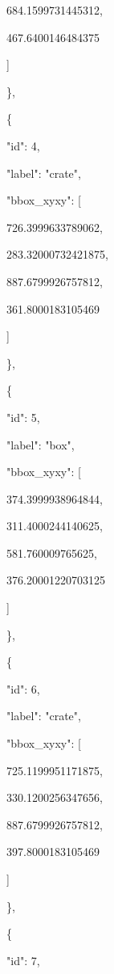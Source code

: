 \documentclass[10pt,a4paper]{article}
\begin{document}
        684.1599731445312,\allowbreak{}\par
        467.6400146484375\par
      ]\par
    \},\allowbreak{}\par
    \{\par
      "id":\allowbreak{} 4,\allowbreak{}\par
      "label":\allowbreak{} "crate",\allowbreak{}\par
      "bbox\_xyxy":\allowbreak{} [\par
        726.3999633789062,\allowbreak{}\par
        283.32000732421875,\allowbreak{}\par
        887.6799926757812,\allowbreak{}\par
        361.8000183105469\par
      ]\par
    \},\allowbreak{}\par
    \{\par
      "id":\allowbreak{} 5,\allowbreak{}\par
      "label":\allowbreak{} "box",\allowbreak{}\par
      "bbox\_xyxy":\allowbreak{} [\par
        374.3999938964844,\allowbreak{}\par
        311.4000244140625,\allowbreak{}\par
        581.760009765625,\allowbreak{}\par
        376.20001220703125\par
      ]\par
    \},\allowbreak{}\par
    \{\par
      "id":\allowbreak{} 6,\allowbreak{}\par
      "label":\allowbreak{} "crate",\allowbreak{}\par
      "bbox\_xyxy":\allowbreak{} [\par
        725.1199951171875,\allowbreak{}\par
        330.1200256347656,\allowbreak{}\par
        887.6799926757812,\allowbreak{}\par
        397.8000183105469\par
      ]\par
    \},\allowbreak{}\par
    \{\par
      "id":\allowbreak{} 7,\allowbreak{}\par
\end{document}
